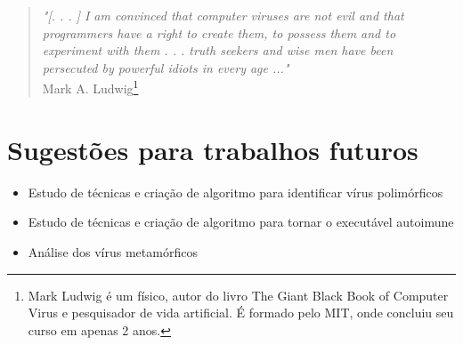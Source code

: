 \begin{quotation}
\noindent
\emph{"[. . . ] I am convinced that computer viruses are not evil and that\\
programmers have a right to create them, to possess them and to\\
experiment with them . . . truth seekers and wise men have been\\
persecuted by powerful idiots in every age ..."}\\
Mark A. Ludwig\footnote{Mark Ludwig é um físico, autor do livro The Giant Black Book of Computer Virus e pesquisador de vida artificial. É formado pelo MIT, onde concluiu seu curso em apenas 2 anos.}
\end{quotation}


\section{Sugestões para trabalhos futuros}
\begin{itemize}
\item Estudo de técnicas e criação de algoritmo para identificar vírus polimórficos
\item Estudo de técnicas e criação de algoritmo para tornar o executável autoimune
\item Análise dos vírus metamórficos
\end{itemize}
